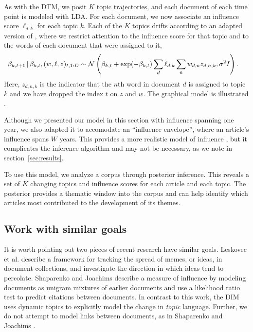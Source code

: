 As with the DTM, we posit $K$ topic trajectories, and each document of
each time point is modeled with LDA.  For each document, we now
associate an influence score $\ell_{d,k}$ for each topic $k$.  Each of
the $K$ topics drifts according to an adapted version of
, where we restrict attention to the influence
score for that topic and to the words of each document that were
assigned to it,
\begin{equation}
  \begin{split}
    \label{eq:logistic-normal-influence-topics}
    \beta_{k,t+1} & \, | \, \beta_{k,t}, (w, \ell, z)_{t,1:D} \sim
    \mathcal{N}\left(
      \beta_{k,t} +
      \exp(-\beta_{k,t}) \sum_{d} \ell_{d,k} \sum_n w_{d,n} z_{d,n,k},
      \sigma^2 I
    \right).
  \end{split}
\end{equation}
Here, $z_{d,n,k}$ is the indicator that the $n$th word in document $d$
is assigned to topic $k$ and we have dropped the index $t$ on $z$ and
$w$.  The graphical model is illustrated .

Although we presented our model in this section with influence
spanning one year, we also adapted it to accomodate an ``influence
envelope'', where an article's influence spans $W$ years.  This
provides a more realistic model of influence \cite{porter:2005}, but
it complicates the inference algorithm and may not be necessary, as we
note in section~\ref{sec:results}.


To use this model, we analyze a corpus through posterior inference.
This reveals a set of $K$ changing topics and influence scores for
each article and each topic.  The posterior provides a thematic window
into the corpus and can help identify which articles most contributed
to the development of its themes.

\subsection*{Work with similar goals}

It is worth pointing out two pieces of recent research have similar
goals. Leskovec et al. \cite{leskovec:2009} describe a framework for
tracking the spread of memes, or ideas, in document collections, and
investigate the direction in which ideas tend to percolate.
Shaparenko and Joachims \cite{shaparenko:2007} describe a measure of
influence by modeling documents as unigram mixtures of earlier
documents and use a likelihood ratio test to predict citations between
documents. In contrast to this work, the DIM uses dynamic topics to
explicitly model the change in \emph{topic} language.  Further, we do
not attempt to model links between documents, as in Shaparenko and
Joachims \cite{shaparenko:2007}.  %
